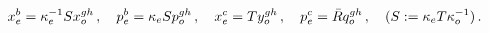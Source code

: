 \begin{equation}
x_{e}^{b}=\kappa _{e}^{-1}Sx_{o}^{gh}\,,\quad p_{e}^{b}=\kappa
_{e}Sp_{o}^{gh}\,,\quad x_{e}^{c}=Ty_{o}^{gh}\,,\quad p_{e}^{c}=\bar{R}%
q_{o}^{gh}\,,\quad (S:=\kappa _{e}T\kappa _{o}^{-1})\,.  \notag
\end{equation}%
